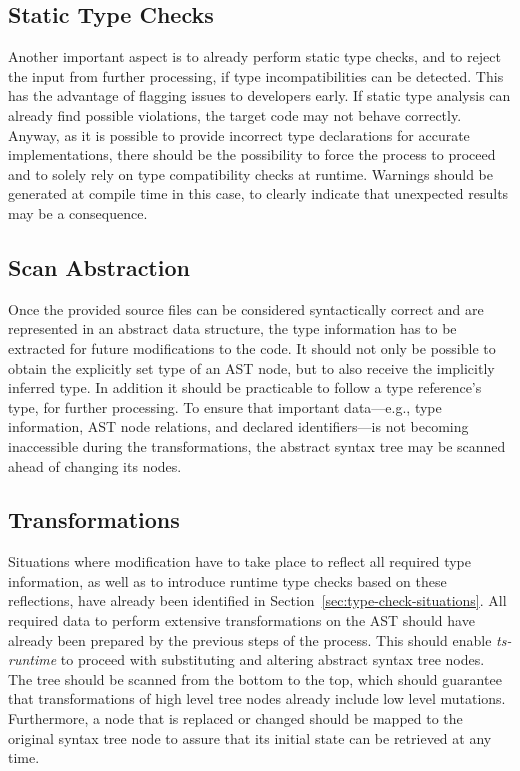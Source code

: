 \subsection{Static Type Checks}

Another important aspect is to already perform static type checks, and to reject the input from further processing, if type incompatibilities can be detected. This has the advantage of flagging issues to developers early. If static type analysis can already find possible violations, the target code may not behave correctly. Anyway, as it is possible to provide incorrect type declarations for accurate implementations, there should be the possibility to force the process to proceed and to solely rely on type compatibility checks at runtime. Warnings should be generated at compile time in this case, to clearly indicate that unexpected results may be a consequence.

\subsection{Scan Abstraction}

Once the provided source files can be considered syntactically correct and are represented in an abstract data structure, the type information has to be extracted for future modifications to the code. It should not only be possible to obtain the explicitly set type of an AST node, but to also receive the implicitly inferred type. In addition it should be practicable to follow a type reference's type, for further processing. To ensure that important data---e.g., type information, AST node relations, and declared identifiers---is not becoming inaccessible during the transformations, the abstract syntax tree may be scanned ahead of changing its nodes.

\subsection{Transformations}

Situations where modification have to take place to reflect all required type information, as well as to introduce runtime type checks based on these reflections, have already been identified in Section~\ref{sec:type-check-situations}. All required data to perform extensive transformations on the AST should have already been prepared by the previous steps of the process. This should enable \emph{ts-runtime} to proceed with substituting and altering abstract syntax tree nodes. The tree should be scanned from the bottom to the top, which should guarantee that transformations of high level tree nodes already include low level mutations. Furthermore, a node that is replaced or changed should be mapped to the original syntax tree node to assure that its initial state can be retrieved at any time.

